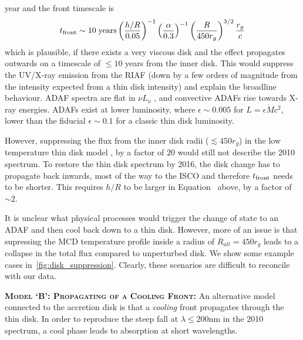 \documentclass[11pt,a4paper]{article}
\begin{document}
year and the front timescale is
\begin{equation}
    t_{\rm front}  \sim  10 \; {\rm years} \left(\frac{h/R}{0.05}\right)^{-1}
                                                           \left(\frac{\alpha}{0.3}\right)^{-1}  
                                                           \left(\frac{R}{450r_{g}}\right)^{3/2}  
                                                           \frac{r_{g}}{c}
\label{eqn:t_front}
\end{equation}
which is plausible, if there exists a very viscous disk and the effect
propagates outwards on a timescale of $\leq 10$ years from the inner
disk. This would suppress the UV/X-ray emission from the RIAF (down by
a few orders of magnitude from the intensity expected from a thin disk
intensity) and explain the broadline behaviour.  ADAF spectra are flat
in $\nu L_{\nu}$ \citet{Narayan1998, Abramowicz2002, Abramowicz2013},
and convective ADAFs rise towards X-ray energies. ADAFs exist at lower
luminosity, where $\epsilon \sim 0.005$ for $L=\epsilon \dot{M}
c^{2}$, lower than the fiducial $\epsilon \sim 0.1$ for a classic thin
disk luminosity.

However, suppressing the flux from the inner disk radii ($\lesssim 450 r_{g}$)
in the low temperature thin disk model \citep{Narayan1997, Gammie1999,
Agol_Krolik2000, Afshordi_Paczynski2003, Ford2018}, by a factor of
$20$ would still not describe the 2010 spectrum. To restore the thin disk
spectrum by 2016, the disk change has to propagate back inwards, most
of the way to the ISCO and therefore $t_{\rm front}$ needs to be
shorter. This requires $h/R$ to be larger in
Equation~\label{eqn:t_front} above, by a factor of $\sim 2$.

It is unclear what physical processes would trigger the change of
state to an ADAF and then cool back down to a thin disk. However, more
of an issue is that supressing the MCD temperature profile inside a
radius of $R_{alt} = 450 r_{g}$ leads to a collapse in the total
flux compared to unperturbed disk. We show some example cases
in~\ref{fig:disk_suppression}. Clearly, these scenarios are difficult
to reconcile with our data.

\smallskip \smallskip
\noindent
\textbf{\textsc{Model `B': Propagating of a Cooling Front: }}
An alternative model connected to the accretion disk is that a
\emph{cooling} front propagates through the thin disk.  In order to
reproduce the steep fall at $\lambda \leq 200$nm in the 2010 spectrum,
a cool phase leads to absorption at short wavelengths.
\end{document}
